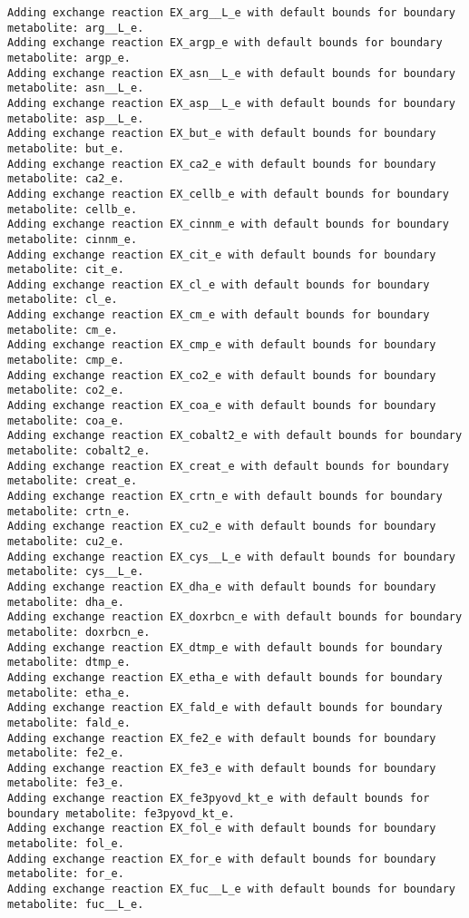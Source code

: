 \documentclass[
  letterpaper,
  DIV=11,
  numbers=noendperiod]{scrartcl}
\begin{document}
\begin{verbatim}
Adding exchange reaction EX_arg__L_e with default bounds for boundary metabolite: arg__L_e.
Adding exchange reaction EX_argp_e with default bounds for boundary metabolite: argp_e.
Adding exchange reaction EX_asn__L_e with default bounds for boundary metabolite: asn__L_e.
Adding exchange reaction EX_asp__L_e with default bounds for boundary metabolite: asp__L_e.
Adding exchange reaction EX_but_e with default bounds for boundary metabolite: but_e.
Adding exchange reaction EX_ca2_e with default bounds for boundary metabolite: ca2_e.
Adding exchange reaction EX_cellb_e with default bounds for boundary metabolite: cellb_e.
Adding exchange reaction EX_cinnm_e with default bounds for boundary metabolite: cinnm_e.
Adding exchange reaction EX_cit_e with default bounds for boundary metabolite: cit_e.
Adding exchange reaction EX_cl_e with default bounds for boundary metabolite: cl_e.
Adding exchange reaction EX_cm_e with default bounds for boundary metabolite: cm_e.
Adding exchange reaction EX_cmp_e with default bounds for boundary metabolite: cmp_e.
Adding exchange reaction EX_co2_e with default bounds for boundary metabolite: co2_e.
Adding exchange reaction EX_coa_e with default bounds for boundary metabolite: coa_e.
Adding exchange reaction EX_cobalt2_e with default bounds for boundary metabolite: cobalt2_e.
Adding exchange reaction EX_creat_e with default bounds for boundary metabolite: creat_e.
Adding exchange reaction EX_crtn_e with default bounds for boundary metabolite: crtn_e.
Adding exchange reaction EX_cu2_e with default bounds for boundary metabolite: cu2_e.
Adding exchange reaction EX_cys__L_e with default bounds for boundary metabolite: cys__L_e.
Adding exchange reaction EX_dha_e with default bounds for boundary metabolite: dha_e.
Adding exchange reaction EX_doxrbcn_e with default bounds for boundary metabolite: doxrbcn_e.
Adding exchange reaction EX_dtmp_e with default bounds for boundary metabolite: dtmp_e.
Adding exchange reaction EX_etha_e with default bounds for boundary metabolite: etha_e.
Adding exchange reaction EX_fald_e with default bounds for boundary metabolite: fald_e.
Adding exchange reaction EX_fe2_e with default bounds for boundary metabolite: fe2_e.
Adding exchange reaction EX_fe3_e with default bounds for boundary metabolite: fe3_e.
Adding exchange reaction EX_fe3pyovd_kt_e with default bounds for boundary metabolite: fe3pyovd_kt_e.
Adding exchange reaction EX_fol_e with default bounds for boundary metabolite: fol_e.
Adding exchange reaction EX_for_e with default bounds for boundary metabolite: for_e.
Adding exchange reaction EX_fuc__L_e with default bounds for boundary metabolite: fuc__L_e.

\end{verbatim}
\end{document}
